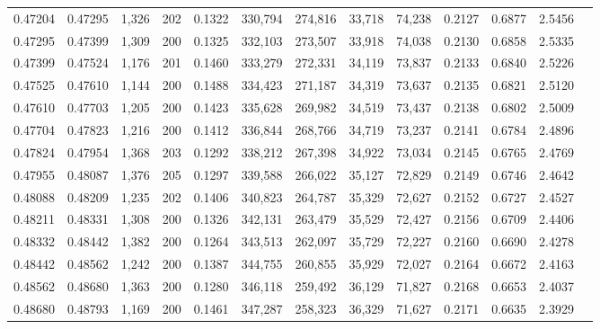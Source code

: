 \begin{tabular}{rrrrrrrrrrrrr}
0.47204 & 0.47295 & 1,326 & 202 &                                     0.1322 & 330,794 & 274,816 &  33,718 &  74,238 & 0.2127 & 0.6877 & 2.5456 \\
0.47295 & 0.47399 & 1,309 & 200 &                                     0.1325 & 332,103 & 273,507 &  33,918 &  74,038 & 0.2130 & 0.6858 & 2.5335 \\
0.47399 & 0.47524 & 1,176 & 201 &                                     0.1460 & 333,279 & 272,331 &  34,119 &  73,837 & 0.2133 & 0.6840 & 2.5226 \\
0.47525 & 0.47610 & 1,144 & 200 &                                     0.1488 & 334,423 & 271,187 &  34,319 &  73,637 & 0.2135 & 0.6821 & 2.5120 \\
0.47610 & 0.47703 & 1,205 & 200 &                                     0.1423 & 335,628 & 269,982 &  34,519 &  73,437 & 0.2138 & 0.6802 & 2.5009 \\
0.47704 & 0.47823 & 1,216 & 200 &                                     0.1412 & 336,844 & 268,766 &  34,719 &  73,237 & 0.2141 & 0.6784 & 2.4896 \\
0.47824 & 0.47954 & 1,368 & 203 &                                     0.1292 & 338,212 & 267,398 &  34,922 &  73,034 & 0.2145 & 0.6765 & 2.4769 \\
0.47955 & 0.48087 & 1,376 & 205 &                                     0.1297 & 339,588 & 266,022 &  35,127 &  72,829 & 0.2149 & 0.6746 & 2.4642 \\
0.48088 & 0.48209 & 1,235 & 202 &                                     0.1406 & 340,823 & 264,787 &  35,329 &  72,627 & 0.2152 & 0.6727 & 2.4527 \\
0.48211 & 0.48331 & 1,308 & 200 &                                     0.1326 & 342,131 & 263,479 &  35,529 &  72,427 & 0.2156 & 0.6709 & 2.4406 \\
0.48332 & 0.48442 & 1,382 & 200 &                                     0.1264 & 343,513 & 262,097 &  35,729 &  72,227 & 0.2160 & 0.6690 & 2.4278 \\
0.48442 & 0.48562 & 1,242 & 200 &                                     0.1387 & 344,755 & 260,855 &  35,929 &  72,027 & 0.2164 & 0.6672 & 2.4163 \\
0.48562 & 0.48680 & 1,363 & 200 &                                     0.1280 & 346,118 & 259,492 &  36,129 &  71,827 & 0.2168 & 0.6653 & 2.4037 \\
0.48680 & 0.48793 & 1,169 & 200 &                                     0.1461 & 347,287 & 258,323 &  36,329 &  71,627 & 0.2171 & 0.6635 & 2.3929 \\

\end{tabular}
